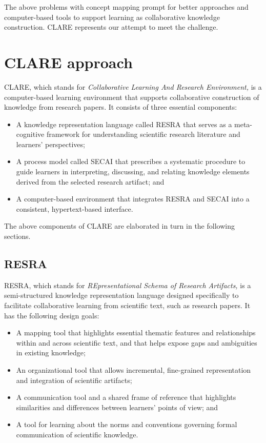 The above problems with concept mapping prompt for better approaches and
computer-based tools to support learning as collaborative knowledge
construction. CLARE represents our attempt to meet the challenge.


\section{CLARE approach}
\label{sec:clare-approach}

CLARE, which stands for {\it Collaborative Learning And Research
Environment,} is a computer-based learning environment that supports
collaborative construction of knowledge from research papers.  It
consists of three essential components:

\begin{itemize}
\item A knowledge representation language called RESRA that serves as
  a meta-cognitive framework for understanding scientific research
  literature and learners' perspectives;

\item A process model called SECAI that prescribes a systematic procedure
  to guide learners in interpreting, discussing, and relating
  knowledge elements derived from the selected research artifact; and

\item A computer-based environment that integrates RESRA and SECAI into a
  consistent, hypertext-based interface. 
\end{itemize}

The above components of CLARE are elaborated in turn in the following
sections.


\subsection{RESRA}
\label{sec:resra}

RESRA, which stands for {\it REpresentational Schema of Research
Artifacts,} is a semi-structured knowledge representation language designed
specifically to facilitate collaborative learning from scientific text,
such as research papers. It has the following design goals:

\begin{itemize}
 \item A mapping tool that highlights essential thematic features and
  relationships within and across scientific text, and that helps
  expose gaps and ambiguities in existing knowledge;

\item An organizational tool that allows incremental, fine-grained
  representation and integration of scientific artifacts;
  
\item A communication tool and a shared frame of reference that
  highlights similarities and differences between learners'
  points of view; and
  
\item A tool for learning about the norms and conventions governing formal
  communication of scientific knowledge.
\end{itemize}

